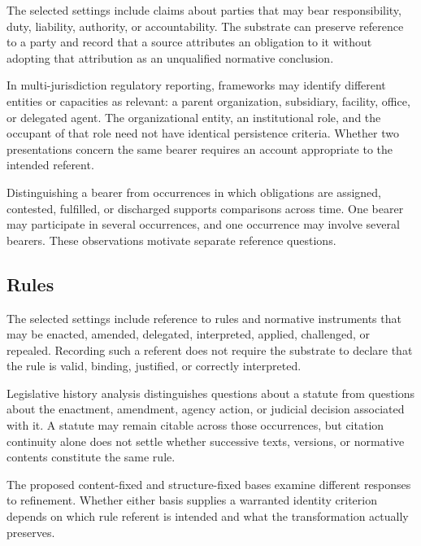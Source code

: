 The selected settings include claims about parties that may bear
responsibility, duty, liability, authority, or accountability.
The substrate can preserve reference to a party and record that a source
attributes an obligation to it without adopting that attribution as
an unqualified normative conclusion.

In multi-jurisdiction regulatory reporting, frameworks may identify
different entities or capacities as relevant: a parent organization,
subsidiary, facility, office, or delegated agent.
The organizational
entity, an institutional role, and the occupant of that role need not
have identical persistence criteria.
Whether two presentations concern
the same bearer requires an account appropriate to the intended referent.

Distinguishing a bearer from occurrences in which obligations are
assigned, contested, fulfilled, or discharged supports comparisons
across time.
One bearer may participate in several occurrences, and
one occurrence may involve several bearers.
These observations motivate
separate reference questions.

\subsection{Rules}
\label{subsec:inventory_rules}

The selected settings include reference to rules and normative
instruments that may be enacted, amended, delegated, interpreted,
applied, challenged, or repealed.
Recording such a referent does not
require the substrate to declare that the rule is valid, binding,
justified, or correctly interpreted.

Legislative history analysis distinguishes questions about a statute
from questions about the enactment, amendment, agency action, or
judicial decision associated with it.
A statute may remain citable
across those occurrences, but citation continuity alone does not
settle whether successive texts, versions, or normative contents
constitute the same rule.

The proposed content-fixed and structure-fixed bases examine different
responses to refinement.
Whether either basis supplies a warranted
identity criterion depends on which rule referent is intended and
what the transformation actually preserves.

